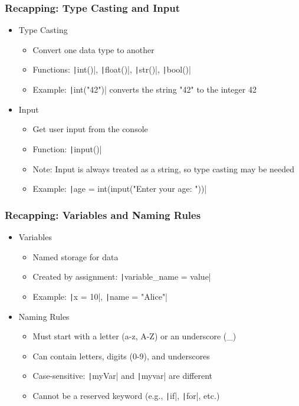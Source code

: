 \documentclass{beamer}
\newcommand{\python}[1]{\texttt|#1|}
\begin{document}
\begin{frame}
    \frametitle{Recapping: Type Casting and Input}
    \begin{itemize}
        \item Type Casting
              \begin{itemize}
                  \item Convert one data type to another
                  \item Functions: \python{int()}, \python{float()}, \python{str()}, \python{bool()}
                  \item Example: \python{int("42")} converts the string "42" to the integer 42
              \end{itemize}
        \item Input
              \begin{itemize}
                  \item Get user input from the console
                  \item Function: \python{input()}
                  \item Note: Input is always treated as a string, so type casting may be needed
                  \item Example: \python{age = int(input("Enter your age: "))}
              \end{itemize}
    \end{itemize}
\end{frame}
\begin{frame}
    \frametitle{Recapping: Variables and Naming Rules}
    \begin{itemize}
        \item Variables
              \begin{itemize}
                  \item Named storage for data
                  \item Created by assignment: \python{variable_name = value}
                  \item Example: \python{x = 10}, \python{name = "Alice"}
              \end{itemize}
        \item Naming Rules
              \begin{itemize}
                  \item Must start with a letter (a-z, A-Z) or an underscore (\_)
                  \item Can contain letters, digits (0-9), and underscores
                  \item Case-sensitive: \python{myVar} and \python{myvar} are different
                  \item Cannot be a reserved keyword (e.g., \python{if}, \python{for}, etc.)
              \end{itemize}
    \end{itemize}
\end{frame}
\end{document}
